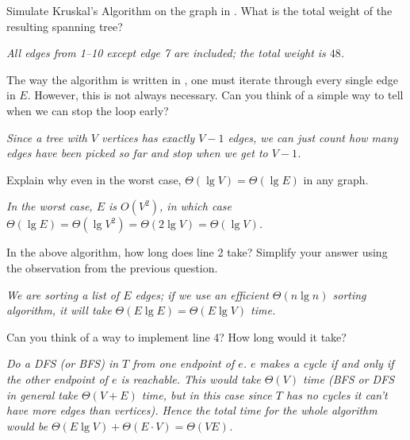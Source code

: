 \documentclass{tufte-handout}
\begin{document}
\begin{questions}
\item Simulate Kruskal's Algorithm on the graph in
  .  What is the total weight of the resulting
  spanning tree?

  \emph{All edges from 1--10 except edge 7 are included; the total
  weight is $48$.}
\item The way the algorithm is written in , one
  must iterate through every single edge in $E$.  However, this is not
  always necessary.  Can you think of a simple way to tell when we can
  stop the loop early?

  \emph{Since a tree with $V$ vertices has exactly $V-1$ edges, we can
  just count how many edges have been picked so far and stop when we
  get to $V-1$.}
\item Explain why even in the worst case,
  $\Theta(\lg V) = \Theta(\lg E)$ in any graph.

  \emph{In the worst case, $E$ is $O(V^2)$, in which case $\Theta(\lg
    E) = \Theta(\lg V^2) = \Theta(2 \lg V) = \Theta(\lg V)$.}
\item In the above algorithm, how long does line 2 take?  Simplify
  your answer using the observation from the previous question.

  \emph{We are sorting a list of $E$ edges; if we use an efficient
    $\Theta(n \lg n)$ sorting algorithm, it will take $\Theta(E \lg E)
    = \Theta(E \lg V)$ time.}
\item Can you think of a way to implement line 4?  How long would it
  take?

  \emph{Do a DFS (or BFS) in $T$ from one endpoint of $e$.  $e$
    makes a cycle if and only if the other endpoint of $e$ is
    reachable.  This would take $\Theta(V)$ time (BFS or DFS in
    general take $\Theta(V+E)$ time, but in this case since $T$ has no
    cycles it can't have more edges than vertices).  Hence the total
    time for the whole algorithm would be $\Theta(E \lg V) + \Theta(E
    \cdot V) = \Theta(VE)$.}
\end{questions}

\pause
\end{document}
